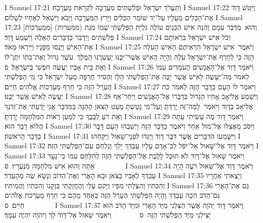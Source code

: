 I Samuel 17:21	וַתַּעֲרֹךְ יִשְׂרָאֵל וּפְלִשְׁתִּים מַעֲרָכָה לִקְרַאת מַעֲרָכָה׃
I Samuel 17:22	וַיִּטֹּשׁ דָּוִד אֶת־הַכֵּלִים מֵעָלָיו עַל־יַד שׁוֹמֵר הַכֵּלִים וַיָּרץ הַמַּעֲרָכָה וַיָּבֹא וַיִּשְׁאַל לְאֶחָיו לְשָׁלוֹם׃
I Samuel 17:23	וְהוּא  מְדַבֵּר עִמָּם וְהִנֵּה אִישׁ הַבֵּנַיִם עוֹלֶה גּלְיָת הַפְּלִשְׁתִּי שְׁמוֹ מִגַּת (ממערות) [מִמַּעַרְכוֹת] פְּלִשְׁתִּים וַיְדַבֵּר כַּדְּבָרִים הָאֵלֶּה וַיִּשְׁמַע דָּוִד׃
I Samuel 17:24	וְכֹל אִישׁ יִשְׂרָאֵל בִּרְאוֹתָם אֶת־הָאִישׁ וַיָּנֻסוּ מִפָּנָיו וַיִּירְאוּ מְאֹד׃
I Samuel 17:25	וַיֹּאמֶר  אִישׁ יִשְׂרָאֵל הַרְּאִיתֶם הָאִישׁ הָעֹלֶה הַזֶּה כִּי לְחָרֵף אֶת־יִשְׂרָאֵל עֹלֶה וְהָיָה הָאִישׁ אֲשֶׁר־יַכֶּנּוּ יַעְשְׁרֶנּוּ הַמֶּלֶךְ  עֹשֶׁר גָּדוֹל וְאֶת־בִּתּוֹ יִתֶּן־לוֹ וְאֵת בֵּית אָבִיו יַעֲשֶׂה חפְשִׁי בְּיִשְׂרָאֵל׃ {פ}
I Samuel 17:26	וַיֹּאמֶר דָּוִד אֶל־הָאֲנָשִׁים הָעֹמְדִים עִמּוֹ לֵאמֹר מַה־יֵּעָשֶׂה לָאִישׁ אֲשֶׁר יַכֶּה אֶת־הַפְּלִשְׁתִּי הַלָּז וְהֵסִיר חֶרְפָּה מֵעַל יִשְׂרָאֵל כִּי מִי הַפְּלִשְׁתִּי הֶעָרֵל הַזֶּה כִּי חֵרֵף מַעַרְכוֹת אֱלֹהִים חַיִּים׃
I Samuel 17:27	וַיֹּאמֶר לוֹ הָעָם כַּדָּבָר הַזֶּה לֵאמֹר כֹּה יֵעָשֶׂה לָאִישׁ אֲשֶׁר יַכֶּנּוּ׃
I Samuel 17:28	וַיִּשְׁמַע אֱלִיאָב אָחִיו הַגָּדוֹל בְּדַבְּרוֹ אֶל־הָאֲנָשִׁים וַיִּחַר־אַף אֱלִיאָב בְּדָוִד וַיֹּאמֶר  לָמָּה־זֶּה יָרַדְתָּ וְעַל־מִי נָטַשְׁתָּ מְעַט הַצֹּאן הָהֵנָּה בַּמִּדְבָּר אֲנִי יָדַעְתִּי אֶת־זְדֹנְךָ וְאֵת רֹעַ לְבָבֶךָ כִּי לְמַעַן רְאוֹת הַמִּלְחָמָה יָרָדְתָּ׃
I Samuel 17:29	וַיֹּאמֶר דָּוִד מֶה עָשִׂיתִי עָתָּה הֲלוֹא דָּבָר הוּא׃
I Samuel 17:30	וַיִּסֹּב מֵאֶצְלוֹ אֶל־מוּל אַחֵר וַיֹּאמֶר כַּדָּבָר הַזֶּה וַיְשִׁבֻהוּ הָעָם דָּבָר כַּדָּבָר הָרִאשׁוֹן׃
I Samuel 17:31	וַיִּשָּׁמְעוּ הַדְּבָרִים אֲשֶׁר דִּבֶּר דָּוִד וַיַּגִּדוּ לִפְנֵי־שָׁאוּל וַיִּקָּחֵהוּ׃
I Samuel 17:32	וַיֹּאמֶר דָּוִד אֶל־שָׁאוּל אַל־יִפֹּל לֵב־אָדָם עָלָיו עַבְדְּךָ יֵלֵךְ וְנִלְחַם עִם־הַפְּלִשְׁתִּי הַזֶּה׃
I Samuel 17:33	וַיֹּאמֶר שָׁאוּל אֶל־דָּוִד לֹא תוּכַל לָלֶכֶת אֶל־הַפְּלִשְׁתִּי הַזֶּה לְהִלָּחֵם עִמּוֹ כִּי־נַעַר אַתָּה וְהוּא אִישׁ מִלְחָמָה מִנְּעֻרָיו׃ {ס}        
I Samuel 17:34	וַיֹּאמֶר דָּוִד אֶל־שָׁאוּל רֹעֶה הָיָה עַבְדְּךָ לְאָבִיו בַּצֹּאן וּבָא הָאֲרִי וְאֶת־הַדּוֹב וְנָשָׂא שֶׂה מֵהָעֵדֶר׃
I Samuel 17:35	וְיָצָאתִי אַחֲרָיו וְהִכִּתִיו וְהִצַּלְתִּי מִפִּיו וַיָּקם עָלַי וְהֶחֱזַקְתִּי בִּזְקָנוֹ וְהִכִּתִיו וַהֲמִיתִּיו׃
I Samuel 17:36	גַּם אֶת־הָאֲרִי גַּם־הַדֹּב הִכָּה עַבְדֶּךָ וְהָיָה הַפְּלִשְׁתִּי הֶעָרֵל הַזֶּה כְּאַחַד מֵהֶם כִּי חֵרֵף מַעַרְכֹת אֱלֹהִים חַיִּים׃ {ס}        
I Samuel 17:37	וַיֹּאמֶר דָּוִד יְהֹוָה אֲשֶׁר הִצִּלַנִי מִיַּד הָאֲרִי וּמִיַּד הַדֹּב הוּא יַצִּילֵנִי מִיַּד הַפְּלִשְׁתִּי הַזֶּה {ס}        וַיֹּאמֶר שָׁאוּל אֶל־דָּוִד לֵךְ וַיהֹוָה יִהְיֶה עִמָּךְ׃

